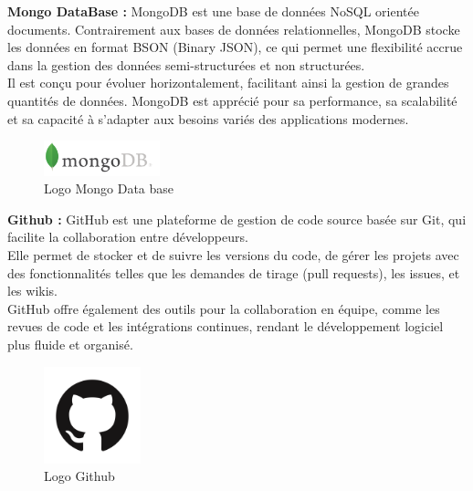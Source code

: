 {\bf{Mongo DataBase :}}
MongoDB est une base de données NoSQL orientée documents. Contrairement aux bases de données relationnelles, MongoDB stocke les données en format BSON (Binary JSON), ce qui permet une flexibilité accrue dans la gestion des données semi-structurées et non structurées. 
\\
Il est conçu pour évoluer horizontalement, facilitant ainsi la gestion de grandes quantités de données. MongoDB est apprécié pour sa performance, sa scalabilité et sa capacité à s'adapter aux besoins variés des applications modernes.
 \begin{figure}[H]%
    \center%
    \includegraphics[width=0.3\textwidth]{pages/images/mongo.png}
    \caption{ Logo Mongo Data base}\label{fig:test}%
  \end{figure}





{\bf{Github :}}
GitHub est une plateforme de gestion de code source basée sur Git, qui facilite la collaboration entre développeurs.
\\
Elle permet de stocker et de suivre les versions du code, de gérer les projets avec des fonctionnalités telles que les demandes de tirage (pull requests), les issues, et les wikis.
\\
GitHub offre également des outils pour la collaboration en équipe, comme les revues de code et les intégrations continues, rendant le développement logiciel plus fluide et organisé.
 \begin{figure}[ht]%
    \center%
    \includegraphics[width=0.25\textwidth]{pages/images/GitHub.png}
    \caption{ Logo Github}\label{fig:test}%
  \end{figure}







